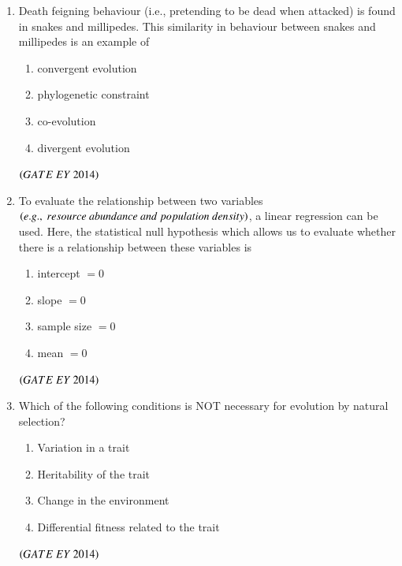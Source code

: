 \documentclass[journal]{IEEEtran}
\numberwithin{equation}{enumi}
\numberwithin{figure}{enumi}
\begin{document}
\begin{enumerate}
    \item Death feigning behaviour (i.e., pretending to be dead when attacked) is found in snakes and millipedes. This similarity in behaviour between snakes and millipedes is an example of
    \begin{multicols}{2}
    \begin{enumerate}
        \item convergent evolution
        \item phylogenetic constraint
        \item co-evolution
        \item divergent evolution
    \end{enumerate}
    \end{multicols}
    \hfill{$\brak{ GATE\ EY\ 2014}$}
    \bigskip

    \item To evaluate the relationship between two variables $\brak{e.g.,\ resource\ abundance\ and\ population\ density}$, a linear regression can be used. Here, the statistical null hypothesis which allows us to evaluate whether there is a relationship between these variables is
    \begin{multicols}{2}
    \begin{enumerate}
        \item intercept $=0$
        \item slope $=0$
        \item sample size $=0$
        \item mean $=0$
    \end{enumerate}
    \end{multicols}
    \hfill{$\brak{ GATE\ EY\ 2014}$}
    \bigskip

    \item Which of the following conditions is NOT necessary for evolution by natural selection?
    \begin{multicols}{2}
    \begin{enumerate}
        \item Variation in a trait
        \item Heritability of the trait
        \item Change in the environment
        \item Differential fitness related to the trait
    \end{enumerate}
    \end{multicols}
    \hfill{$\brak{ GATE\ EY\ 2014}$}
    \bigskip
    

\end{enumerate}
\end{document}
